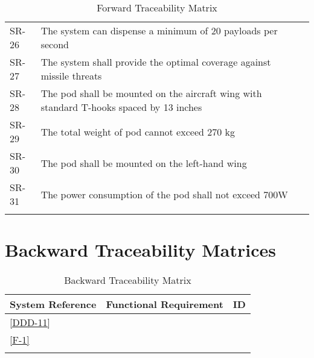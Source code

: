 \documentclass[Main]{subfiles}
\begin{document}
\begin{longtable}{p{} p{} p{}}
SR-26 & The system can dispense a minimum of 20 payloads per second &  \\

SR-27 & The system shall provide the optimal coverage against	missile threats &  \\

SR-28 & The pod shall be mounted on the aircraft wing with standard T-hooks spaced by 13 inches &  \\

SR-29 & The total weight of pod cannot exceed 270 kg  &  \\

SR-30 & The pod shall be mounted on the left-hand wing &  \\

SR-31 & The power consumption of the pod shall not exceed 700W &  \\\hline

\caption{Forward Traceability Matrix}
\label{Tab:Forward}
\end{longtable}





\newpage
\section{Backward Traceability Matrices}

\begin{longtable}{l p{10.4cm} p{1.8cm} } \hline
System Reference & Functional Requirement & ID\\\hline
\ref{DDD-11} & \\
\ref{F-1}

\\\hline
\caption{Backward Traceability Matrix}
\label{Tab:Backward}
\end{longtable}
\end{document}
